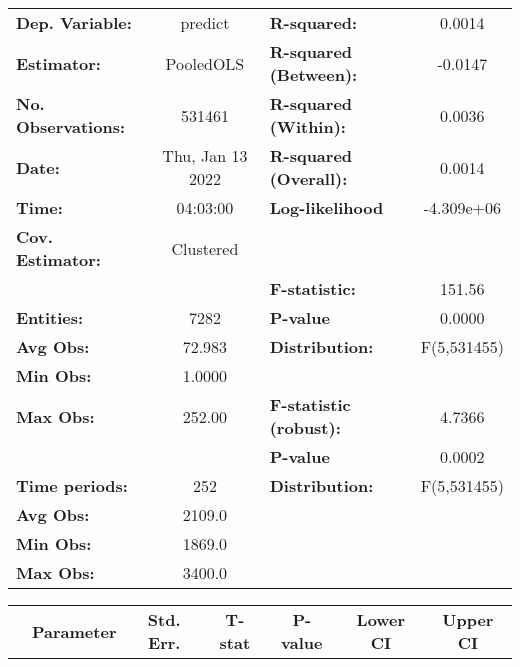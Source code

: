 \begin{center}
\begin{tabular}{lclc}
\toprule
\textbf{Dep. Variable:}    &      predict       & \textbf{  R-squared:         }   &      0.0014      \\
\textbf{Estimator:}        &     PooledOLS      & \textbf{  R-squared (Between):}  &     -0.0147      \\
\textbf{No. Observations:} &       531461       & \textbf{  R-squared (Within):}   &      0.0036      \\
\textbf{Date:}             &  Thu, Jan 13 2022  & \textbf{  R-squared (Overall):}  &      0.0014      \\
\textbf{Time:}             &      04:03:00      & \textbf{  Log-likelihood     }   &    -4.309e+06    \\
\textbf{Cov. Estimator:}   &     Clustered      & \textbf{                     }   &                  \\
\textbf{}                  &                    & \textbf{  F-statistic:       }   &      151.56      \\
\textbf{Entities:}         &        7282        & \textbf{  P-value            }   &      0.0000      \\
\textbf{Avg Obs:}          &       72.983       & \textbf{  Distribution:      }   &   F(5,531455)    \\
\textbf{Min Obs:}          &       1.0000       & \textbf{                     }   &                  \\
\textbf{Max Obs:}          &       252.00       & \textbf{  F-statistic (robust):} &      4.7366      \\
\textbf{}                  &                    & \textbf{  P-value            }   &      0.0002      \\
\textbf{Time periods:}     &        252         & \textbf{  Distribution:      }   &   F(5,531455)    \\
\textbf{Avg Obs:}          &       2109.0       & \textbf{                     }   &                  \\
\textbf{Min Obs:}          &       1869.0       & \textbf{                     }   &                  \\
\textbf{Max Obs:}          &       3400.0       & \textbf{                     }   &                  \\
\bottomrule
\end{tabular}
\begin{tabular}{lcccccc}
                & \textbf{Parameter} & \textbf{Std. Err.} & \textbf{T-stat} & \textbf{P-value} & \textbf{Lower CI} & \textbf{Upper CI}  \\

\end{tabular}
\end{center}
